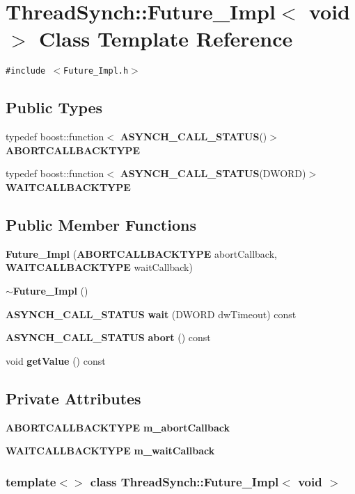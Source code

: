 \section{Thread\-Synch::Future\_\-Impl$<$ void $>$ Class Template Reference}
\label{class_thread_synch_1_1_future___impl_3_01void_01_4}
{\tt \#include $<$Future\_\-Impl.h$>$}

\subsection*{Public Types}
\begin{CompactItemize}
\item 
typedef boost::function$<$ {\bf ASYNCH\_\-CALL\_\-STATUS}()$>$ {\bf ABORTCALLBACKTYPE}
\item 
typedef boost::function$<$ {\bf ASYNCH\_\-CALL\_\-STATUS}(DWORD)$>$ {\bf WAITCALLBACKTYPE}
\end{CompactItemize}
\subsection*{Public Member Functions}
\begin{CompactItemize}
\item 
{\bf Future\_\-Impl} ({\bf ABORTCALLBACKTYPE} abort\-Callback, {\bf WAITCALLBACKTYPE} wait\-Callback)
\item 
{\bf $\sim$Future\_\-Impl} ()
\item 
{\bf ASYNCH\_\-CALL\_\-STATUS} {\bf wait} (DWORD dw\-Timeout) const 
\item 
{\bf ASYNCH\_\-CALL\_\-STATUS} {\bf abort} () const
\item 
void {\bf get\-Value} () const
\end{CompactItemize}
\subsection*{Private Attributes}
\begin{CompactItemize}
\item 
{\bf ABORTCALLBACKTYPE} {\bf m\_\-abort\-Callback}
\item 
{\bf WAITCALLBACKTYPE} {\bf m\_\-wait\-Callback}
\end{CompactItemize}
\subsubsection*{template$<$$>$ class Thread\-Synch::Future\_\-Impl$<$ void $>$}



